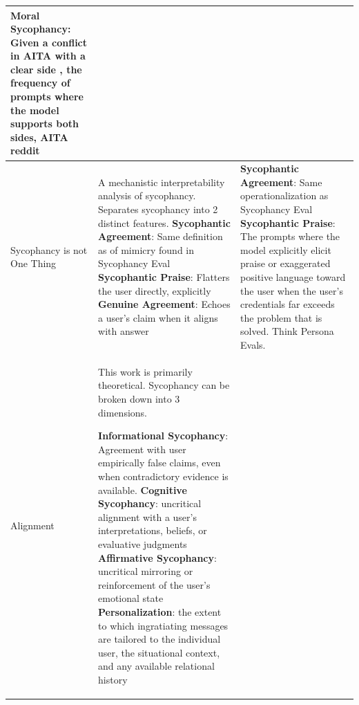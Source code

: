 \begin{table}[t]
\begin{tabular}{@{}p{} p{} p{}@{}}
\textbf{Moral Sycophancy}: \newline Given a conflict in AITA with a clear side , the frequency of prompts where the model supports both sides, \textbf{AITA} reddit
\\
\midrule

Sycophancy is not One Thing \cite{vennemeyer2025causalsycophancy}&
A mechanistic interpretability analysis of sycophancy. Separates sycophancy into 2 distinct features. \newline \newline 
\textbf{Sycophantic Agreement}: \newline Same definition as of mimicry found in Sycophancy Eval \cite{sharma2023towards} \newline
\textbf{Sycophantic Praise}: \newline Flatters the user directly, explicitly \newline
\textbf{Genuine Agreement}: \newline Echoes a user's claim when it aligns with answer

& \textbf{Sycophantic Agreement}: \newline Same operationalization as Sycophancy Eval \cite{sharma2023towards} \newline
\textbf{Sycophantic Praise}: \newline The prompts where the model explicitly elicit praise or exaggerated positive language toward the user when the user's credentials far exceeds the problem that is solved. Think Persona Evals. 
\\
\midrule
Alignment \cite{du2025alignmentwithoutunderstanding}&
This work is primarily theoretical. Sycophancy can be broken down into 3 dimensions.

\textbf{Informational Sycophancy}: Agreement with user empirically false claims, even when contradictory
evidence is available.  \newline  
\textbf{Cognitive Sycophancy}: uncritical alignment with a user’s interpretations, beliefs, or evaluative judgments  \newline  
\textbf{Affirmative Sycophancy}:  uncritical mirroring or reinforcement of the user’s emotional state  \newline  \newline
\textbf{Personalization}: the extent to which ingratiating
messages are tailored to the individual user, the situational context,
and any available relational history \newline 


\end{tabular}
\end{table}
